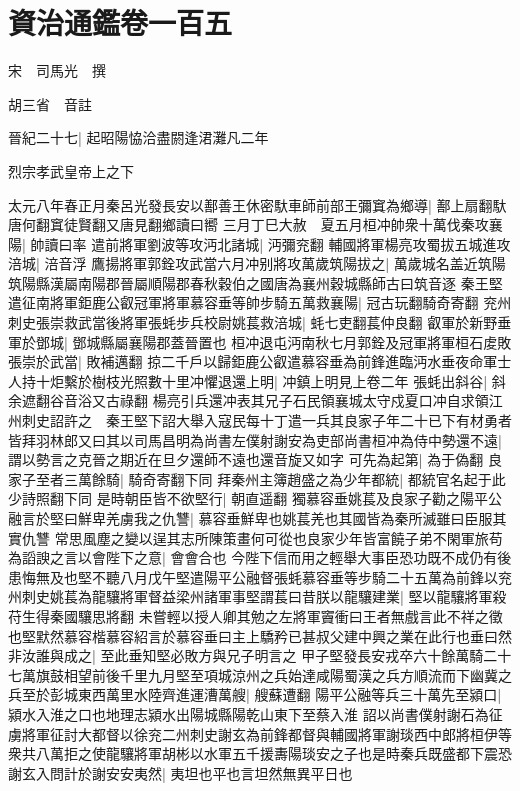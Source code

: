 \chapter{資治通鑑卷一百五}
宋　司馬光　撰

胡三省　音註

晉紀二十七|{
	起昭陽恊洽盡閼逢涒灘凡二年}


烈宗孝武皇帝上之下

太元八年春正月秦呂光發長安以鄯善王休密馱車師前部王彌窴為鄉導|{
	鄯上扇翻馱唐何翻窴徒賢翻又唐見翻鄉讀曰嚮}
三月丁巳大赦　夏五月桓冲帥衆十萬伐秦攻襄陽|{
	帥讀曰率}
遣前將軍劉波等攻沔北諸城|{
	沔彌兖翻}
輔國將軍楊亮攻蜀拔五城進攻涪城|{
	涪音浮}
鷹揚將軍郭銓攻武當六月冲别將攻萬歲筑陽拔之|{
	萬歲城名盖近筑陽筑陽縣漢屬南陽郡晉屬順陽郡春秋穀伯之國唐為襄州穀城縣師古曰筑音逐}
秦王堅遣征南將軍鉅鹿公叡冠軍將軍慕容垂等帥步騎五萬救襄陽|{
	冠古玩翻騎奇寄翻}
兖州刺史張崇救武當後將軍張蚝步兵校尉姚萇救涪城|{
	蚝七吏翻萇仲良翻}
叡軍於新野垂軍於鄧城|{
	鄧城縣屬襄陽郡蓋晉置也}
桓冲退屯沔南秋七月郭銓及冠軍將軍桓石䖍敗張崇於武當|{
	敗補邁翻}
掠二千戶以歸鉅鹿公叡遣慕容垂為前鋒進臨沔水垂夜命軍士人持十炬繫於樹枝光照數十里冲懼退還上明|{
	冲鎮上明見上卷二年}
張蚝出斜谷|{
	斜余遮翻谷音浴又古祿翻}
楊亮引兵還冲表其兄子石民領襄城太守戍夏口冲自求領江州刺史詔許之　秦王堅下詔大舉入寇民每十丁遣一兵其良家子年二十已下有材勇者皆拜羽林郎又曰其以司馬昌明為尚書左僕射謝安為吏部尚書桓冲為侍中勢還不遠|{
	謂以勢言之克晉之期近在旦夕還師不遠也還音旋又如字}
可先為起第|{
	為于偽翻}
良家子至者三萬餘騎|{
	騎奇寄翻下同}
拜秦州主簿趙盛之為少年都統|{
	都統官名起于此少詩照翻下同}
是時朝臣皆不欲堅行|{
	朝直遥翻}
獨慕容垂姚萇及良家子勸之陽平公融言於堅曰鮮卑羌虜我之仇讐|{
	慕容垂鮮卑也姚萇羌也其國皆為秦所滅雖曰臣服其實仇讐}
常思風塵之變以逞其志所陳策畫何可從也良家少年皆富饒子弟不閑軍旅苟為謟諛之言以會陛下之意|{
	會會合也}
今陛下信而用之輕舉大事臣恐功既不成仍有後患悔無及也堅不聽八月戊午堅遣陽平公融督張蚝慕容垂等步騎二十五萬為前鋒以兖州刺史姚萇為龍驤將軍督益梁州諸軍事堅謂萇曰昔朕以龍驤建業|{
	堅以龍驤將軍殺苻生得秦國驤思將翻}
未嘗輕以授人卿其勉之左將軍竇衝曰王者無戲言此不祥之徵也堅默然慕容楷慕容紹言於慕容垂曰主上驕矜已甚叔父建中興之業在此行也垂曰然非汝誰與成之|{
	至此垂知堅必敗方與兄子明言之}
甲子堅發長安戎卒六十餘萬騎二十七萬旗鼓相望前後千里九月堅至項城涼州之兵始達咸陽蜀漢之兵方順流而下幽冀之兵至於彭城東西萬里水陸齊進運漕萬艘|{
	艘蘇遭翻}
陽平公融等兵三十萬先至潁口|{
	潁水入淮之口也地理志潁水出陽城縣陽乾山東下至蔡入淮}
詔以尚書僕射謝石為征虜將軍征討大都督以徐兖二州刺史謝玄為前鋒都督與輔國將軍謝琰西中郎將桓伊等衆共八萬拒之使龍驤將軍胡彬以水軍五千援夀陽琰安之子也是時秦兵既盛都下震恐謝玄入問計於謝安安夷然|{
	夷坦也平也言坦然無異平日也}

